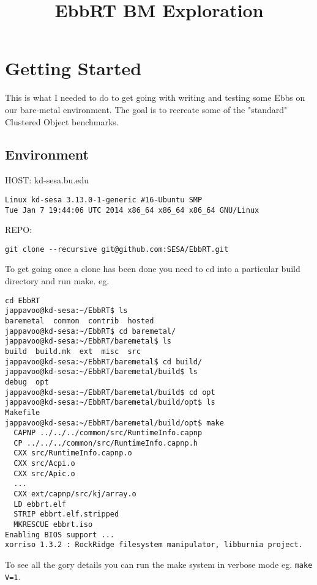 \documentclass[11pt]{report}
\title{EbbRT BM Exploration}
\begin{document}
\maketitle

\chapter{Getting Started}

This is what I needed to do to get going with writing and testing
some Ebbs on our bare-metal environment.  The goal is to recreate
some of the "standard" Clustered Object benchmarks.

\section{Environment}
\begin{description}
\item{HOST:} kd-sesa.bu.edu 
\begin{verbatim}
Linux kd-sesa 3.13.0-1-generic #16-Ubuntu SMP 
Tue Jan 7 19:44:06 UTC 2014 x86_64 x86_64 x86_64 GNU/Linux
\end{verbatim}
\item{REPO:} 
\begin{verbatim}
git clone --recursive git@github.com:SESA/EbbRT.git
\end{verbatim}
\end{description}

To get going once a clone has been done you need to cd into a particular build
directory and run make. eg.
\begin{verbatim}
cd EbbRT
jappavoo@kd-sesa:~/EbbRT$ ls
baremetal  common  contrib  hosted
jappavoo@kd-sesa:~/EbbRT$ cd baremetal/
jappavoo@kd-sesa:~/EbbRT/baremetal$ ls
build  build.mk  ext  misc  src
jappavoo@kd-sesa:~/EbbRT/baremetal$ cd build/
jappavoo@kd-sesa:~/EbbRT/baremetal/build$ ls
debug  opt
jappavoo@kd-sesa:~/EbbRT/baremetal/build$ cd opt
jappavoo@kd-sesa:~/EbbRT/baremetal/build/opt$ ls
Makefile
jappavoo@kd-sesa:~/EbbRT/baremetal/build/opt$ make
  CAPNP ../../../common/src/RuntimeInfo.capnp
  CP ../../../common/src/RuntimeInfo.capnp.h
  CXX src/RuntimeInfo.capnp.o
  CXX src/Acpi.o
  CXX src/Apic.o
  ...
  CXX ext/capnp/src/kj/array.o
  LD ebbrt.elf
  STRIP ebbrt.elf.stripped
  MKRESCUE ebbrt.iso
Enabling BIOS support ...
xorriso 1.3.2 : RockRidge filesystem manipulator, libburnia project.  
\end{verbatim}

To see all the gory details you can run the make system in verbose mode eg.
{\tt make V=1}.
\end{document}
